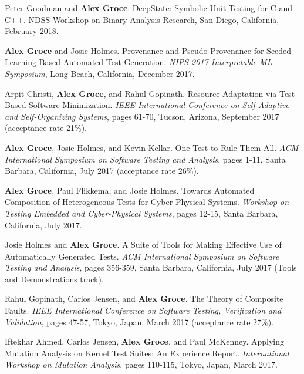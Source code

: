 \documentclass[ComputerScience]{vita}
\begin{document}
\begin{vita}
\begin{Refereed Conference and Workshop Publications}
\item Peter Goodman and {\bf Alex Groce}.
\newblock DeepState: Symbolic Unit Testing for C and C++.
\newblock NDSS Workshop on Binary Analysis Research, San Diego, California, February 2018.

\item {\bf Alex Groce} and Josie Holmes.
\newblock Provenance and Pseudo-Provenance for Seeded Learning-Based Automated Test Generation.
\newblock \emph{NIPS 2017 Interpretable ML Symposium}, Long Beach, California, December 2017.

\item Arpit Christi, {\bf Alex Groce}, and Rahul Gopinath.
\newblock Resource Adaptation via Test-Based Software Minimization.
\newblock \emph{IEEE International Conference on Self-Adaptive and Self-Organizing Systems}, pages 61-70, Tucson, Arizona, September 2017 (acceptance rate 21\%).

\item {\bf Alex Groce}, Josie Holmes, and Kevin Kellar.
\newblock One Test to Rule Them All.
\newblock \emph{ACM International Symposium on Software Testing and Analysis}, pages 1-11, Santa Barbara, California, July 2017 (acceptance rate 26\%).

\item {\bf Alex Groce}, Paul Flikkema, and Josie Holmes.
\newblock Towards Automated Composition of Heterogeneous Tests for Cyber-Physical Systems.
\newblock \emph{Workshop on Testing Embedded and Cyber-Physical Systems}, pages 12-15, Santa Barbara, California, July 2017.

\item Josie Holmes and {\bf Alex Groce}.
\newblock A Suite of Tools for Making Effective Use of Automatically Generated Tests.
\newblock \emph{ACM International Symposium on Software Testing and Analysis}, pages 356-359, Santa Barbara, California, July 2017 (Tools and Demonstrations track).

\item Rahul Gopinath, Carlos Jensen, and {\bf Alex Groce}.
\newblock The Theory of Composite Faults.
\newblock \emph{IEEE International Conference on Software Testing, Verification and Validation}, pages 47-57, Tokyo, Japan, March 2017 (acceptance rate 27\%).

\item Iftekhar Ahmed, Carlos Jensen, {\bf Alex Groce}, and Paul McKenney.
\newblock Applying Mutation Analysis on Kernel Test Suites: An Experience Report.
\newblock \emph{International Workshop on Mutation Analysis}, pages 110-115, Tokyo, Japan, March 2017.


\end{Refereed Conference and Workshop Publications}
\end{vita}
\end{document}
